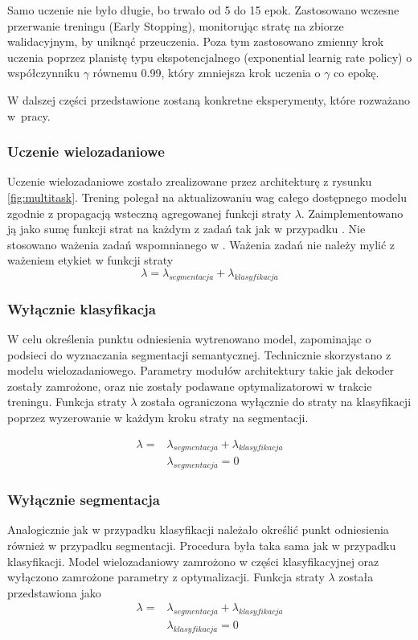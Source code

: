 Samo uczenie nie było długie, bo trwało od 5 do 15 epok. Zastosowano wczesne przerwanie treningu (Early Stopping), monitorując stratę na zbiorze walidacyjnym, by uniknąć przeuczenia. Poza tym zastosowano zmienny krok uczenia poprzez planistę typu ekspotencjalnego (exponential learnig rate policy) o współczynniku $\gamma$ równemu 0.99, który zmniejsza krok uczenia o $\gamma$ co epokę.

W dalszej części przedstawione zostaną konkretne eksperymenty, które rozważano w~pracy.

\subsubsection{Uczenie wielozadaniowe}
Uczenie wielozadaniowe zostało zrealizowane przez architekturę z rysunku \ref{fig:multitask}. Trening polegał na aktualizowaniu wag całego dostępnego modelu zgodnie z propagacją wsteczną agregowanej funkcji straty $\lambda$. Zaimplementowano ją jako sumę funkcji strat na każdym z zadań tak jak w przypadku \cite{mehta2018net}. Nie stosowano ważenia zadań wspomnianego w \cite{9892852}. Ważenia zadań nie należy mylić z ważeniem etykiet w funkcji straty
\begin{equation*}
\lambda = \lambda_{segmentacja} + \lambda_{klasyfikacja}
\end{equation*}

\subsubsection{Wyłącznie klasyfikacja}
W celu określenia punktu odniesienia wytrenowano model, zapominając o podsieci do wyznaczania segmentacji semantycznej. Technicznie skorzystano z modelu wielozadaniowego. Parametry modułów architektury takie jak dekoder zostały zamrożone, oraz nie zostały podawane optymalizatorowi w trakcie treningu. Funkcja straty $\lambda$ została ograniczona wyłącznie do straty na klasyfikacji poprzez wyzerowanie w każdym kroku straty na segmentacji.

\begin{align*}
\lambda  = & \lambda_{segmentacja} + \lambda_{klasyfikacja} \\
           & \lambda_{segmentacja} = 0
\end{align*}
\subsubsection{Wyłącznie segmentacja}
Analogicznie jak w przypadku klasyfikacji należało określić punkt odniesienia również w przypadku segmentacji. Procedura była taka sama jak w przypadku klasyfikacji. Model wielozadaniowy zamrożono w części klasyfikacyjnej oraz wyłączono zamrożone parametry z optymalizacji. Funkcja straty $\lambda$ została przedstawiona jako
\begin{align*}
\lambda = & \lambda_{segmentacja} + \lambda_{klasyfikacja} \\
          & \lambda_{klasyfikacja} = 0
\end{align*}
